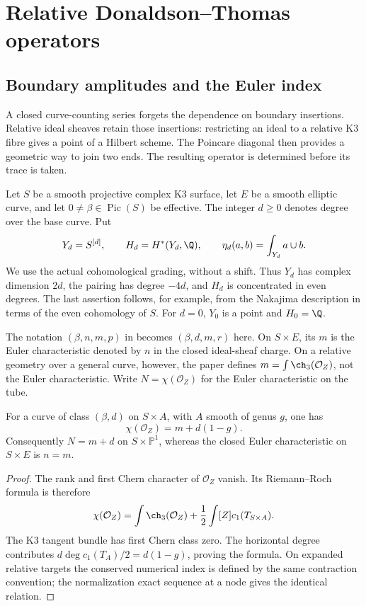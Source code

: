 \chapter{Relative Donaldson--Thomas operators}
\label{ch:relative-dt}

\section{Boundary amplitudes and the Euler index}
\label{rdt:sec:index}

A closed curve-counting series forgets the dependence on boundary
insertions. Relative ideal sheaves retain those insertions: restricting
an ideal to a relative K3 fibre gives a point of a Hilbert scheme. The
Poincare diagonal then provides a geometric way to join two ends.
The resulting operator is determined before its trace is taken.

Let $S$ be a smooth projective complex K3 surface, let $E$ be a smooth
elliptic curve, and let $0\ne\beta\in\operatorname{Pic}(S)$ be effective.
The integer $d\ge0$ denotes degree over the base curve. Put
\[
 Y_d=S^{[d]},\qquad H_d=H^*(Y_d,\Q),\qquad
 \eta_d(a,b)=\int_{Y_d}a\cup b.
\]
We use the actual cohomological grading, without a shift. Thus $Y_d$ has
complex dimension $2d$, the pairing has degree $-4d$, and $H_d$ is
concentrated in even degrees. The last assertion follows, for example,
from the Nakajima description in terms of the even cohomology of $S$.
For $d=0$, $Y_0$ is a point and $H_0=\Q$.

\begin{convention}\label{rdt:conv:index}
The notation $(\beta,n,m,p)$ in \cite{OberdieckMC} becomes
$(\beta,d,m,r)$ here. On $S\times E$, its $m$ is the Euler
characteristic denoted by $n$ in the closed ideal-sheaf charge.
On a relative geometry over a general curve, however, the paper defines
$m=\int\ch_3(\mathcal O_Z)$, not the Euler characteristic.
Write $N=\chi(\mathcal O_Z)$ for the Euler characteristic on the tube.
\end{convention}

\begin{lemma}\label{rdt:lem:index}
For a curve of class $(\beta,d)$ on $S\times A$, with $A$ smooth of
genus $g$, one has
\begin{equation}\label{rdt:eq:RR}
 \chi(\mathcal O_Z)=m+d(1-g).
\end{equation}
Consequently $N=m+d$ on $S\times\mathbb P^1$, whereas the closed
Euler characteristic on $S\times E$ is $n=m$.
\end{lemma}
\begin{proof}
The rank and first Chern character of $\mathcal O_Z$ vanish. Its
Riemann--Roch formula is therefore
\[
 \chi(\mathcal O_Z)=\int\ch_3(\mathcal O_Z)
   +\frac12\int[Z]c_1(T_{S\times A}).
\]
The K3 tangent bundle has first Chern class zero. The horizontal degree
contributes $d\deg c_1(T_A)/2=d(1-g)$, proving the formula. On expanded
relative targets the conserved numerical index is defined by the same
contraction convention; the normalization exact sequence at a node
gives the identical relation.
\end{proof}

